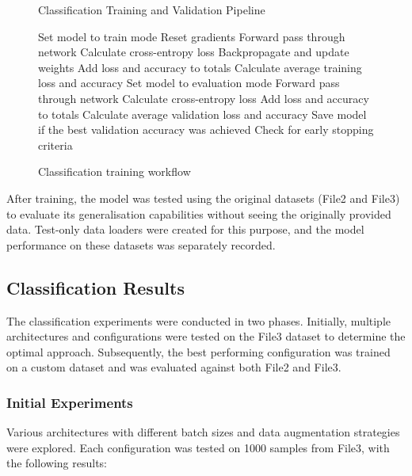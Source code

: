 \documentclass[conference]{IEEEtran}
\begin{document}
\begin{figure}[H]
\begin{algorithm}[H]
\caption{Classification Training and Validation Pipeline}
\begin{algorithmic}[1]
    \STATE Set model to train mode
        \STATE Reset gradients
        \STATE Forward pass through network
        \STATE Calculate cross-entropy loss
        \STATE Backpropagate and update weights
        \STATE Add loss and accuracy to totals
    \ENDFOR
    \STATE Calculate average training loss and accuracy
    \STATE Set model to evaluation mode
        \STATE Forward pass through network
        \STATE Calculate cross-entropy loss
        \STATE Add loss and accuracy to totals
    \ENDFOR
    \STATE Calculate average validation loss and accuracy
    \STATE Save model if the best validation accuracy was achieved
    \STATE Check for early stopping criteria
\ENDFOR
\end{algorithmic}
\end{algorithm}
\caption{Classification training workflow}
\end{figure}

After training, the model was tested using the original datasets (File2 and File3) to evaluate its
generalisation capabilities without seeing the originally provided data. Test-only data loaders were
created for this purpose, and the model performance on these datasets was separately recorded.

\subsection{Classification Results}

The classification experiments were conducted in two phases. Initially, multiple architectures and configurations were tested on the
File3 dataset to determine the optimal approach. Subsequently, the best performing configuration was trained on a custom dataset and
was evaluated against both File2 and File3.

\subsubsection{Initial Experiments}

Various architectures with different batch sizes and data augmentation strategies were explored. Each configuration was tested on
1000 samples from File3, with the following results:
\end{document}
